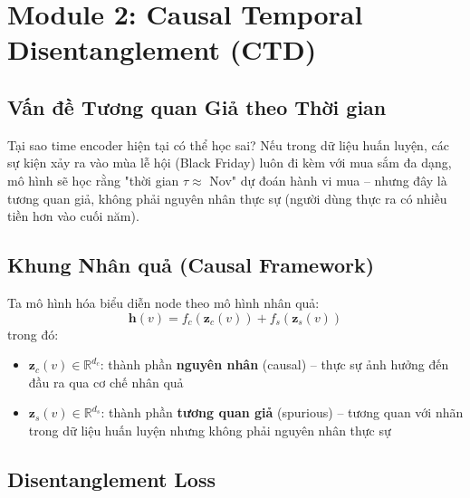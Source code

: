 \documentclass[12pt,a4paper]{article}
\begin{document}
\section{Module 2: Causal Temporal Disentanglement (CTD)}

\subsection{Vấn đề Tương quan Giả theo Thời gian}

\begin{researchbox}
Tại sao time encoder hiện tại có thể học sai? Nếu trong dữ liệu huấn luyện,
các sự kiện xảy ra vào mùa lễ hội (Black Friday) luôn đi kèm với mua sắm đa
dạng, mô hình sẽ học rằng "thời gian $\tau \approx$ Nov" dự đoán hành vi mua --
nhưng đây là tương quan giả, không phải nguyên nhân thực sự (người dùng thực
ra có nhiều tiền hơn vào cuối năm).
\end{researchbox}

\subsection{Khung Nhân quả (Causal Framework)}

Ta mô hình hóa biểu diễn node theo mô hình nhân quả:
\begin{equation}
  \mathbf{h}(v) = f_c(\mathbf{z}_c(v)) + f_s(\mathbf{z}_s(v))
  \label{eq:causal_decomp}
\end{equation}
trong đó:
\begin{itemize}[nosep]
  \item $\mathbf{z}_c(v) \in \mathbb{R}^{d_c}$: thành phần \textbf{nguyên nhân}
        (causal) -- thực sự ảnh hưởng đến đầu ra qua cơ chế nhân quả
  \item $\mathbf{z}_s(v) \in \mathbb{R}^{d_s}$: thành phần \textbf{tương quan giả}
        (spurious) -- tương quan với nhãn trong dữ liệu huấn luyện nhưng không
        phải nguyên nhân thực sự
\end{itemize}

\subsection{Disentanglement Loss}
\end{document}
